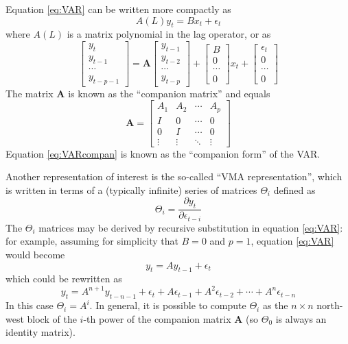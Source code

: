 Equation \eqref{eq:VAR} can be written more compactly as
\begin{equation}
  \label{eq:VARpoly}
  A(L) y_t = B x_t + \epsilon_t
\end{equation}
where $A(L)$ is a matrix polynomial in the lag operator, or as
\begin{equation}
  \label{eq:VARcompan}
  \left[\begin{array}{c} y_t \\ y_{t-1} \\ \cdots \\ y_{t-p-1} 
    \end{array} \right] = 
  \mathbf{A}
  \left[\begin{array}{c} y_{t-1} \\ y_{t-2} \\ \cdots \\ y_{t-p} 
    \end{array} \right] +
  \left[\begin{array}{c} B \\ 0 \\ \cdots \\ 0
    \end{array} \right] x_t +
  \left[\begin{array}{c} \epsilon_t \\ 0 \\ \cdots \\ 0 
    \end{array} \right]
\end{equation}
The matrix $\mathbf{A}$ is known as the ``companion matrix'' and equals
\[
\mathbf{A} =
  \left[\begin{array}{ccccc} 
      A_1 & A_2 & \cdots & A_p \\ 
      I & 0 & \cdots & 0 \\ 
      0 & I & \cdots & 0 \\ 
      \vdots & \vdots & \ddots & \vdots
    \end{array} \right]
\]
Equation \eqref{eq:VARcompan} is known as the ``companion form'' of
the VAR.

Another representation of interest is the so-called ``VMA
representation'', which is written in terms of a (typically infinite)
series of matrices $\Theta_i$ defined as
\begin{equation}
  \label{eq:VMA}
  \Theta_i = \frac{\partial y_t}{\partial \epsilon_{t-i}}
\end{equation}
The $\Theta_i$ matrices may be derived by recursive substitution in
equation \eqref{eq:VAR}: for example, assuming for simplicity that
$B=0$ and $p=1$, equation \eqref{eq:VAR} would become
\[
  y_t = A y_{t-1} + \epsilon_t
\]
which could be rewritten as
\[
  y_t = A^{n+1} y_{t-n-1} + \epsilon_t + A \epsilon_{t-1} + A^2
  \epsilon_{t-2} + \cdots + A^n \epsilon_{t-n}
\]
In this case $\Theta_i = A^i$. In general, it is possible to compute
$\Theta_i$ as the $n \times n$ north-west block of the $i$-th power of the
companion matrix $\mathbf{A}$ (so $\Theta_0$ is always an identity matrix).

